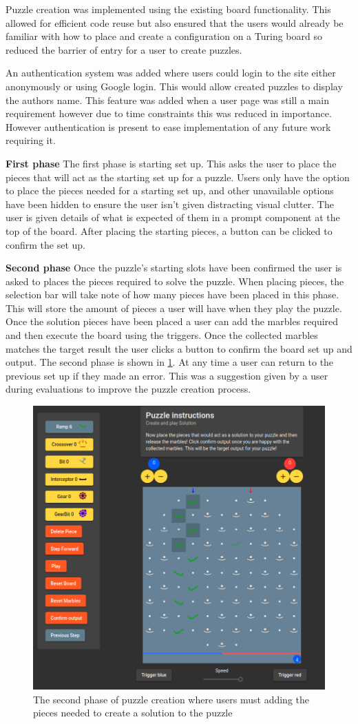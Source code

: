\documentclass{l4proj}
\begin{document}
Puzzle creation was implemented using the existing board functionality. This allowed for efficient code reuse but also ensured that the users would already be familiar with how to place and create a configuration on a Turing board so reduced the barrier of entry for a user to create puzzles.

An authentication system was added where users could login to the site either anonymously or using Google login. This would allow created puzzles to display the authors name. This feature was added when a user page was still a main requirement however due to time constraints this was reduced in importance. However authentication is present to ease implementation of any future work requiring it.

\textbf{First phase}
The first phase is starting set up. This asks the user to place the pieces that will act as the starting set up for a puzzle. Users only have the option to place the pieces needed for a starting set up, and other unavailable options have been hidden to ensure the user isn't given distracting visual clutter. The user is given details of what is expected of them in a prompt component at the top of the board. After placing the starting pieces, a button can be clicked to confirm the set up. 

\textbf{Second phase}
Once the puzzle's starting slots have been confirmed the user is asked to places the pieces required to solve the puzzle. When placing pieces, the selection bar will take note of how many pieces have been placed in this phase. This will store the amount of pieces a user will have when they play the puzzle. Once the solution pieces have been placed a user can add the marbles required and then execute the board using the triggers. Once the collected marbles matches the target result the user clicks a button to confirm the board set up and output. The second phase is shown in \ref{fig:puzzleCreation}. At any time a user can return to the previous set up if they made an error. This was a suggestion given by a user during evaluations to improve the puzzle creation process.


\begin{figure}
    \centering
    \includegraphics[width=0.65\linewidth]{images/puzzleCreation.png}
    \caption{The second phase of puzzle creation where users must adding the pieces needed to create a solution to the puzzle}
    \label{fig:puzzleCreation}
\end{figure}
\end{document}
